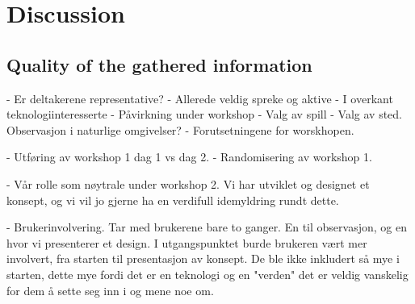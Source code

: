 \chapter{Discussion}

\section{Quality of the gathered information}
- Er deltakerene representative?
	- Allerede veldig spreke og aktive
	- I overkant teknologiinteresserte
- Påvirkning under workshop
- Valg av spill
- Valg av sted. Observasjon i naturlige omgivelser?
- Forutsetningene for worskhopen. 

- Utføring av workshop 1 dag 1 vs dag 2.
- Randomisering av workshop 1. 

- Vår rolle som nøytrale under workshop 2. Vi har utviklet og designet et konsept, og vi vil jo gjerne ha en verdifull idemyldring rundt dette.  

- Brukerinvolvering. Tar med brukerene bare to ganger. En til observasjon, og en hvor vi presenterer et design. I utgangspunktet burde brukeren vært mer involvert, fra starten til presentasjon av konsept. De ble ikke inkludert så mye i starten, dette mye fordi det er en teknologi og en "verden" det er veldig vanskelig for dem å sette seg inn i og mene noe om. 